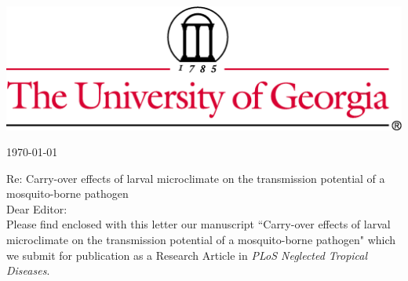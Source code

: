 \documentclass{letter}
\begin{document}

\begin{letter}


\vspace{-2in}
\includegraphics[width=\textwidth]{thin4c.png}

\begin{flushright}
\today
\end{flushright}


Re: Carry-over effects of larval microclimate on the transmission potential of a mosquito-borne pathogen\\

Dear Editor:\\

Please find enclosed with this letter our manuscript ``Carry-over effects of larval microclimate on the transmission potential of a mosquito-borne pathogen" which we submit for publication as a Research Article in \textit{PLoS Neglected Tropical Diseases}.\\


\end{letter}
\end{document}
